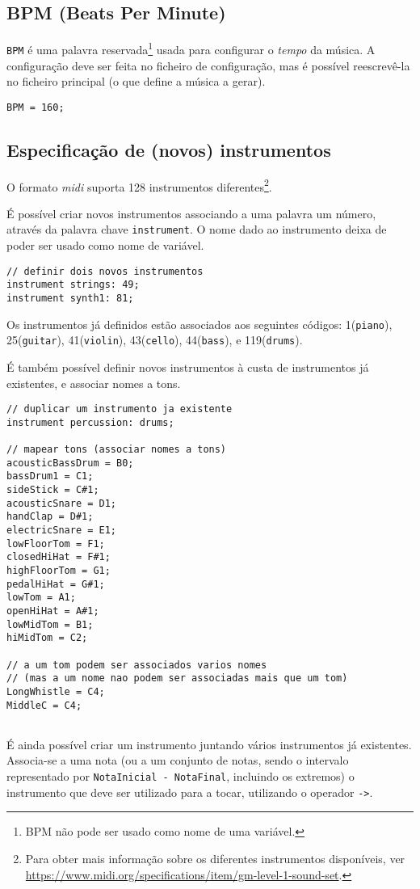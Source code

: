 \documentclass{article}
\begin{document}
\subsection{BPM (Beats Per Minute)}
\texttt{BPM} é uma palavra reservada\footnote{BPM não pode ser usado como nome de uma variável.} usada para configurar o \textit{tempo} da música. A configuração deve ser feita no ficheiro de configuração, mas é possível reescrevê-la no ficheiro principal (o que define a música a gerar).
\begin{lstlisting} 
BPM = 160;
\end{lstlisting}

\subsection{Especificação de (novos) instrumentos}
O formato \textit{midi} suporta 128 instrumentos diferentes\footnote{Para obter mais informação sobre os diferentes instrumentos disponíveis, ver \url{https://www.midi.org/specifications/item/gm-level-1-sound-set}.}.

É possível criar novos instrumentos associando a uma palavra um número, através da palavra chave \texttt{instrument}. O nome dado ao instrumento deixa de poder ser usado como nome de variável.

\begin{lstlisting} 
// definir dois novos instrumentos
instrument strings: 49;
instrument synth1: 81;
\end{lstlisting}

Os instrumentos já definidos estão associados aos seguintes códigos: 1(\texttt{piano}), 25(\texttt{guitar}), 41(\texttt{violin}), 43(\texttt{cello}), 44(\texttt{bass}), e 119(\texttt{drums}). 

É também possível definir novos instrumentos à custa de instrumentos já existentes, e associar nomes a tons.

\begin{lstlisting} 
// duplicar um instrumento ja existente
instrument percussion: drums;

// mapear tons (associar nomes a tons)
acousticBassDrum = B0;
bassDrum1 = C1;
sideStick = C#1;
acousticSnare = D1;
handClap = D#1;
electricSnare = E1;
lowFloorTom = F1;
closedHiHat = F#1;
highFloorTom = G1;
pedalHiHat = G#1;
lowTom = A1;
openHiHat = A#1;
lowMidTom = B1;
hiMidTom = C2;

// a um tom podem ser associados varios nomes
// (mas a um nome nao podem ser associadas mais que um tom)
LongWhistle = C4;
MiddleC = C4;
                     	 
\end{lstlisting}	 
É ainda possível criar um instrumento juntando vários instrumentos já existentes. Associa-se a uma nota (ou a um conjunto de notas, sendo o intervalo representado por \texttt{NotaInicial - NotaFinal}, incluindo os extremos) o instrumento que deve ser utilizado para a tocar, utilizando o operador \texttt{->}.
\end{document}
